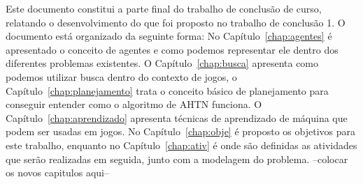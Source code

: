 Este documento constitui a parte final do trabalho de conclusão de curso, relatando o desenvolvimento do que foi proposto no trabalho de conclusão 1. O documento está organizado da seguinte forma: No Capítulo~\ref{chap:agentes} é apresentado o conceito de agentes e como podemos representar ele dentro dos diferentes problemas existentes. O Capítulo~\ref{chap:busca} apresenta como podemos utilizar busca dentro do contexto de jogos, o Capítulo~\ref{chap:planejamento} trata o conceito básico de planejamento para conseguir entender como o algoritmo de AHTN funciona. O Capítulo~\ref{chap:aprendizado} apresenta técnicas de aprendizado de máquina que podem ser usadas em jogos. No Capítulo~\ref{chap:obje} é proposto os objetivos para este trabalho, enquanto no Capítulo~\ref{chap:ativ} é onde são definidas as atividades que serão realizadas em seguida, junto com a modelagem do problema.   --colocar os novos capitulos aqui--
